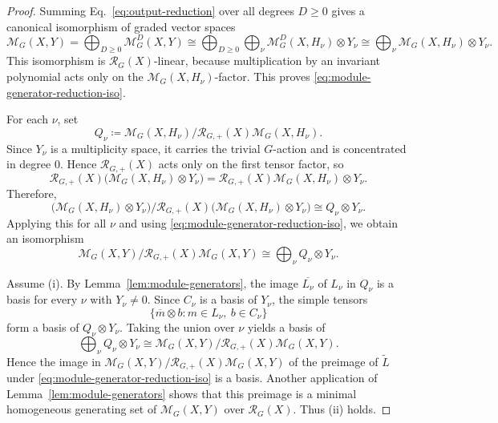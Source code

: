 \documentclass[11pt]{article}
\newcommand{\scM}{\mathcal{M}}
\newcommand{\scR}{\mathcal{R}}
\theoremstyle{definition}
\begin{document}
\begin{proof}
  Summing Eq.~\eqref{eq:output-reduction} over all degrees $D\ge 0$ gives a canonical isomorphism of graded vector spaces
  \[
    \scM_G(X,Y)
    =
    \bigoplus_{D\ge 0}\scM_G^D(X,Y)
    \cong
    \bigoplus_{D\ge 0}\bigoplus_{\nu}\scM_G^D(X,H_\nu)\otimes Y_\nu
    \cong
    \bigoplus_{\nu}\scM_G(X,H_\nu)\otimes Y_\nu.
  \]
  This isomorphism is $\scR_G(X)$-linear, because multiplication by an invariant polynomial acts only on the $\scM_G(X,H_\nu)$-factor.
  This proves \eqref{eq:module-generator-reduction-iso}.

  For each $\nu$, set
  \[
    Q_\nu\coloneq \scM_G(X,H_\nu)\big/\scR_{G,+}(X)\scM_G(X,H_\nu).
  \]
  Since $Y_\nu$ is a multiplicity space, it carries the trivial $G$-action and is concentrated in degree $0$.
  Hence $\scR_{G,+}(X)$ acts only on the first tensor factor, so
  \[
    \scR_{G,+}(X)\bigl(\scM_G(X,H_\nu)\otimes Y_\nu\bigr)
    =
    \scR_{G,+}(X)\scM_G(X,H_\nu)\otimes Y_\nu.
  \]
  Therefore,
  \[
    \bigl(\scM_G(X,H_\nu)\otimes Y_\nu\bigr)\Big/\scR_{G,+}(X)\bigl(\scM_G(X,H_\nu)\otimes Y_\nu\bigr)
    \cong
    Q_\nu\otimes Y_\nu.
  \]
  Applying this for all $\nu$ and using \eqref{eq:module-generator-reduction-iso}, we obtain an isomorphism
  \[
    \scM_G(X,Y)\big/\scR_{G,+}(X)\scM_G(X,Y)
    \cong
    \bigoplus_{\nu} Q_\nu\otimes Y_\nu.
  \]

  Assume \textup{(i)}.
  By Lemma~\ref{lem:module-generators}, the image $\overline{L_\nu}$ of $L_\nu$ in $Q_\nu$ is a basis for every $\nu$ with $Y_\nu\neq 0$.
  Since $C_\nu$ is a basis of $Y_\nu$, the simple tensors
  \[
    \{\overline{m}\otimes b : m\in L_\nu,\ b\in C_\nu\}
  \]
  form a basis of $Q_\nu\otimes Y_\nu$.
  Taking the union over $\nu$ yields a basis of
  \[
    \bigoplus_{\nu} Q_\nu\otimes Y_\nu
    \cong
    \scM_G(X,Y)\big/\scR_{G,+}(X)\scM_G(X,Y).
  \]
  Hence the image in $\scM_G(X,Y)/\scR_{G,+}(X)\scM_G(X,Y)$ of the preimage of $\widetilde L$ under \eqref{eq:module-generator-reduction-iso} is a basis.
  Another application of Lemma~\ref{lem:module-generators} shows that this preimage is a minimal homogeneous generating set of $\scM_G(X,Y)$ over $\scR_G(X)$.
  Thus \textup{(ii)} holds.


\end{proof}
\end{document}
